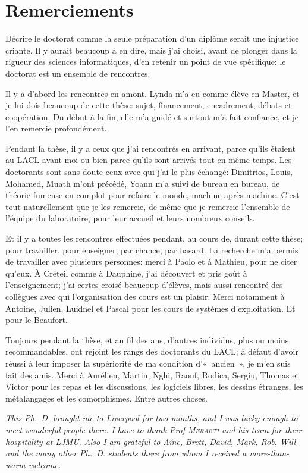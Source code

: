 \chapter{Remerciements}

Décrire le doctorat comme la seule préparation d'un diplôme serait une injustice criante.
Il y aurait beaucoup à en dire, mais j'ai choisi, avant de plonger dans la rigueur des sciences informatiques, d'en retenir un point de vue spécifique: le doctorat est un ensemble de rencontres.

Il y a d'abord les rencontres en amont.
Lynda m'a eu comme élève en Master, et je lui dois beaucoup de cette thèse: sujet, financement, encadrement, débats et coopération.
Du début à la fin, elle m'a guidé et surtout m'a fait confiance, et je l'en remercie profondément.

Pendant la thèse, il y a ceux que j'ai rencontrés en arrivant, parce qu'ils étaient au LACL avant moi ou bien parce qu'ils sont arrivés tout en même temps.
Les doctorants sont sans doute ceux avec qui j'ai le plus échangé: Dimitrios, Louis, Mohamed, Muath m'ont précédé, Yoann m'a suivi de bureau en bureau, de théorie fumeuse en complot pour refaire le monde, machine après machine.
C'est tout naturellement que je les remercie, de même que je remercie l'ensemble de l'équipe du laboratoire, pour leur accueil et leurs nombreux conseils.

Et il y a toutes les rencontres effectuées pendant, au cours de, durant cette thèse; pour travailler, pour enseigner, par chance, par hasard.
La recherche m'a permis de travailler avec plusieurs personnes: merci à Paolo et à Mathieu, pour ne citer qu'eux.
À Créteil comme à Dauphine, j'ai découvert et pris goût à l'enseignement; j'ai certes croisé beaucoup d'élèves, mais aussi rencontré des collègues avec qui l'organisation des cours est un plaisir.
Merci notamment à Antoine, Julien, Luidnel et Pascal pour les cours de systèmes d'exploitation.
Et pour le Beaufort.

Toujours pendant la thèse, et au fil des ans, d'autres individus, plus ou moins recommandables, ont rejoint les rangs des doctorants du LACL; à défaut d'avoir réussi à leur imposer la supériorité de ma condition d'« ancien », je m'en suis fait des amis.
Merci à Aurélien, Martin, Nghi, Raouf, Rodica, Sergiu, Thomas et Victor pour les repas et les discussions, les logiciels libres, les dessins étranges, les métalangages et les comorphismes.
Entre autres choses.

\vfil
\begin{english}
{\it
This Ph.~D. brought me to Liverpool for two months, and I was lucky enough to meet wonderful people there.
I have to thank Prof \textsc{Merabti} and his team for their hospitality at LJMU.
Also I am grateful to Aíne, Brett, David, Mark, Rob, Will and the many other Ph.~D. students there from whom I received a more-than-warm welcome.
}
\end{english}
\vfil

